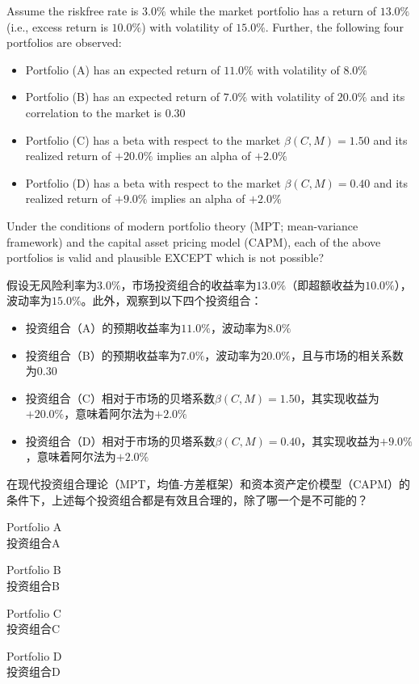 \documentclass{article}
\newcounter{question} %
\begin{document}
\begin{question}
    Assume the riskfree rate is $3.0\%$ while the market portfolio has a return of $13.0\%$ (i.e., excess return is $10.0\%$) with volatility of $15.0\%$. Further, the following four portfolios are observed:
    \begin{itemize}
        \item Portfolio (A) has an expected return of $11.0\%$ with volatility of $8.0\%$
        \item Portfolio (B) has an expected return of $7.0\%$ with volatility of $20.0\%$ and its correlation to the market is $0.30$
        \item Portfolio (C) has a beta with respect to the market $\beta(C, M) = 1.50$ and its realized return of $+20.0\%$ implies an alpha of $+2.0\%$
        \item Portfolio (D) has a beta with respect to the market $\beta(C, M) = 0.40$ and its realized return of $+9.0\%$ implies an alpha of $+2.0\%$
    \end{itemize}
    Under the conditions of modern portfolio theory (MPT; mean-variance framework) and the capital asset pricing model (CAPM), each of the above portfolios is valid and plausible EXCEPT which is not possible?

    假设无风险利率为$3.0\%$，市场投资组合的收益率为$13.0\%$（即超额收益为$10.0\%$），波动率为$15.0\%$。此外，观察到以下四个投资组合：
    \begin{itemize}
        \item 投资组合（A）的预期收益率为$11.0\%$，波动率为$8.0\%$
        \item 投资组合（B）的预期收益率为$7.0\%$，波动率为$20.0\%$，且与市场的相关系数为$0.30$
        \item 投资组合（C）相对于市场的贝塔系数$\beta(C, M) = 1.50$，其实现收益为$+20.0\%$，意味着阿尔法为$+2.0\%$
        \item 投资组合（D）相对于市场的贝塔系数$\beta(C, M) = 0.40$，其实现收益为$+9.0\%$，意味着阿尔法为$+2.0\%$
    \end{itemize}
    在现代投资组合理论（MPT，均值-方差框架）和资本资产定价模型（CAPM）的条件下，上述每个投资组合都是有效且合理的，除了哪一个是不可能的？
    
\end{question}

\begin{choices}
    \item Portfolio A
    \\投资组合A
    \item Portfolio B
    \\投资组合B
    \item Portfolio C
    \\投资组合C
    \item Portfolio D
    \\投资组合D
\end{choices}
\end{document}
